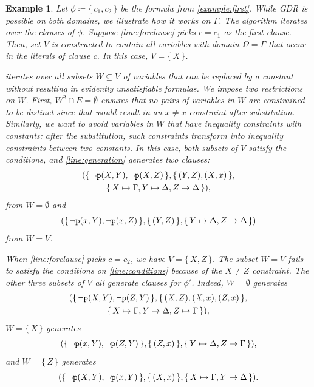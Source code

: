 \documentclass{article}
\newtheorem{example}{Example}
\newcommand{\predicate}{\texttt{\textup{p}}}
\begin{document}
\begin{example}
  Let $\phi \coloneqq \{\, c_1, c_2 \,\}$ be the formula from
  \cref{example:first}. While GDR is possible on both domains, we illustrate how
  it works on $\Gamma$. The algorithm iterates over the clauses of $\phi$.
  Suppose \cref{line:forclause} picks $c = c_1$ as the first clause. Then, set
  $V$ is constructed to contain all variables with domain $\Omega = \Gamma$ that
  occur in the literals of clause $c$. In this case, $V = \{\, X \,\}$.

   iterates over all subsets $W \subseteq V$ of variables
  that can be replaced by a constant without resulting in evidently
  unsatisfiable formulas. We impose two restrictions on $W$. First,
  $W^2 \cap E = \emptyset$ ensures that no pairs of variables in $W$ are
  constrained to be distinct since that would result in an $x \ne x$ constraint
  after substitution. Similarly, we want to avoid variables in $W$ that have
  inequality constraints with constants: after the substitution, such
  constraints transform into inequality constraints between two constants. In
  this case, both subsets of $V$ satisfy the conditions, and
  \cref{line:generation} generates two clauses:
  \begin{multline*}
    (\{\, \neg \predicate(X, Y), \neg \predicate(X, Z) \,\}, \{\, (Y, Z), (X, x) \,\}, \\
    \{\, X \mapsto \Gamma, Y \mapsto \Delta, Z \mapsto \Delta \,\}),
  \end{multline*}
  from $W = \emptyset$ and
  \[
    (\{\, \neg \predicate(x, Y), \neg \predicate(x, Z) \,\}, \{\, (Y, Z) \,\}, \{\, Y \mapsto \Delta, Z \mapsto \Delta \,\})
  \]
  from $W = V$.

  When \cref{line:forclause} picks $c = c_2$, we have $V = \{\, X, Z \,\}$. The
  subset $W = V$ fails to satisfy the conditions on \cref{line:conditions}
  because of the $X \ne Z$ constraint. The other three subsets of $V$ all
  generate clauses for $\phi'$. Indeed, $W = \emptyset$ generates
  \begin{multline*}
    (\{\, \neg \predicate(X, Y), \neg \predicate(Z, Y) \,\}, \{\, (X, Z), (X, x), (Z, x) \,\}, \\
    \{\, X \mapsto \Gamma, Y \mapsto \Delta, Z \mapsto \Gamma \,\}),
  \end{multline*}
  $W = \{\, X \,\}$ generates
  \[
    (\{\, \neg \predicate(x, Y), \neg \predicate(Z, Y) \,\}, \{\, (Z, x) \,\}, \{\, Y \mapsto \Delta, Z \mapsto \Gamma \,\}),
  \]
  and $W = \{\, Z \,\}$ generates
  \[
    (\{\, \neg \predicate(X, Y), \neg \predicate(x, Y) \,\}, \{\, (X, x) \,\}, \{\, X \mapsto \Gamma, Y \mapsto \Delta \,\}).
  \]
\end{example}
\end{document}
